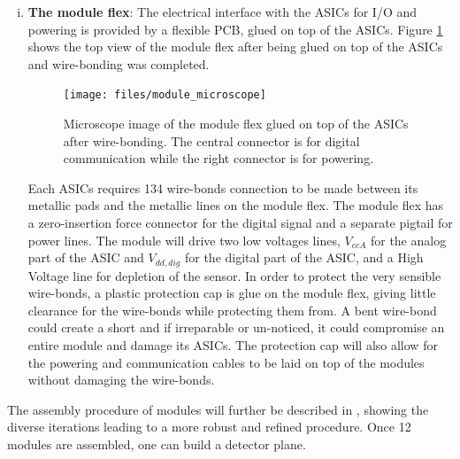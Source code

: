 \begin{enumerate}[i)]
			\item \textbf{The module flex}: The electrical interface with the ASICs for I/O and powering is provided by a flexible PCB, glued on top of the ASICs. Figure \ref{im:module_microscope} shows the top view of the module flex after being glued on top of the ASICs and wire-bonding was completed. 
			\begin{figure}[h]
				\centering
				\texttt{[image: files/module\_microscope]}
				\caption{Microscope image of the module flex glued on top of the ASICs after wire-bonding. The central connector is for digital communication while the right connector is for powering.}
				\label{im:module_microscope}
			\end{figure} 
		
			 Each ASICs requires 134 wire-bonds connection to be made between its metallic pads and the metallic lines on the module flex. The module flex has a zero-insertion force connector for the digital signal and a separate pigtail for power lines. The module will drive two low voltages lines, $V_{ccA}$ for the analog part of the ASIC and $V_{dd,dig}$ for the digital part of the ASIC, and a High Voltage line for depletion of the sensor\cite{PreShower_TP}. In order to protect the very sensible wire-bonds, a plastic protection cap is glue on the module flex, giving little clearance for the wire-bonds while protecting them from. A bent wire-bond could create a short and if irreparable or un-noticed, it could compromise an entire module and damage its ASICs. The protection cap will also allow for the powering and communication cables to be laid on top of the modules without damaging the wire-bonds.  
		\end{enumerate} 
		
		The assembly procedure of modules will further be described in , showing the diverse iterations leading to a more robust and refined procedure. Once 12 modules are assembled, one can build a detector plane. 
		
